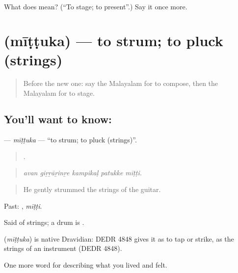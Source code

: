 \begin{tcolorbox}[breakable,colback=teal!4,colframe=teal!35!black,title={Before you move on}]
What does  mean? (\textquotedblleft{}To stage; to present\textquotedblright{}.) Say it once more.
\end{tcolorbox}
\section[\texorpdfstring{\ml{മീട്ടുക} (mīṭṭuka)}{മീട്ടുക (mīṭṭuka)}]{ (mīṭṭuka) — to strum; to pluck (strings)}

\label{lesson:ML-C564-mittuka}



\begin{quote}
Before the new one: say the Malayalam for to compose, then the Malayalam for to stage.
\end{quote}

\subsection*{You'll want to know: }
\textbf{} — \emph{mīṭṭuka} — \textquotedblleft{}to strum; to pluck (strings)\textquotedblright{}.

\begin{quote}
    .
\end{quote}

\begin{quote}
\emph{avan giṟṟāṟinṟe kampikaḷ patukke mīṭṭi.}
\end{quote}

\begin{quote}
He gently strummed the strings of the guitar.
\end{quote}

Past: , \emph{mīṭṭi}.

Said of strings; a drum is .

\begin{cousinweb}
\textbf{} (\emph{mīṭṭuka}) is native Dravidian: DEDR 4848 gives it as to tap or strike, as the strings of an instrument (DEDR 4848).
\end{cousinweb}

\begin{grammarlens}[title={What you've built}]
One more word for describing what you lived and felt.
\end{grammarlens}

